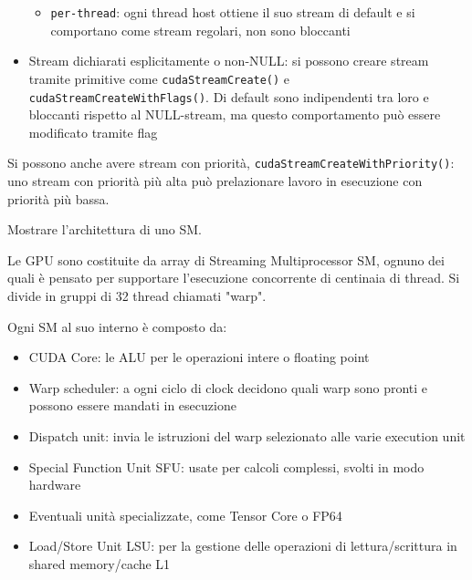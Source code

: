\begin{questions}
\begin{solution}
\begin{itemize}
\begin{itemize}
                \item \texttt{per-thread}: ogni thread host ottiene il suo stream di default e si comportano come stream regolari, non sono bloccanti
            \end{itemize}
            
            \item Stream dichiarati esplicitamente o non-NULL: si possono creare stream tramite primitive come \texttt{cudaStreamCreate()} e \texttt{cudaStreamCreateWithFlags()}. Di default sono indipendenti tra loro e bloccanti rispetto al NULL-stream, ma questo comportamento può essere modificato tramite flag
        \end{itemize}
        
        Si possono anche avere stream con priorità, \texttt{cudaStreamCreateWithPriority()}: uno stream con priorità più alta può prelazionare lavoro in esecuzione con priorità più bassa.
    \end{solution}
    
    \question Mostrare l'architettura di uno SM.
    
    \begin{solution}
        Le GPU sono costituite da array di Streaming Multiprocessor SM, ognuno dei quali è pensato per supportare l'esecuzione concorrente di centinaia di thread. Si divide in gruppi di 32 thread chiamati "warp".
        
        Ogni SM al suo interno è composto da: 
        \begin{itemize}
            \item CUDA Core: le ALU per le operazioni intere o floating point
            
            \item Warp scheduler: a ogni ciclo di clock decidono quali warp sono pronti e possono essere mandati in esecuzione
            
            \item Dispatch unit: invia le istruzioni del warp selezionato alle varie execution unit
            
            \item Special Function Unit SFU: usate per calcoli complessi, svolti in modo hardware
            
            \item Eventuali unità specializzate, come Tensor Core o FP64
            
            \item Load/Store Unit LSU: per la gestione delle operazioni di lettura/scrittura in shared memory/cache L1
            

\end{itemize}
\end{solution}
\end{questions}
